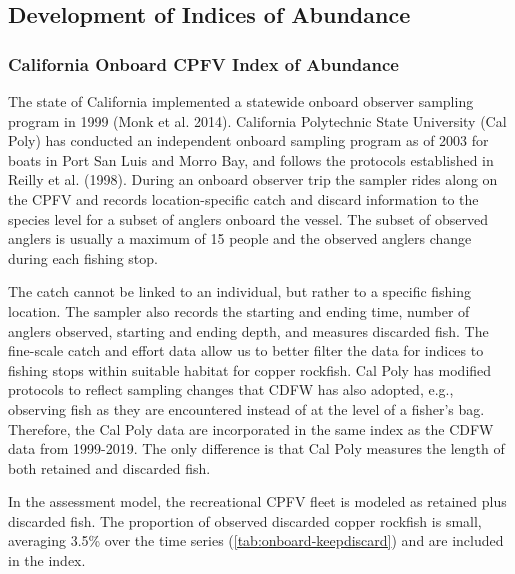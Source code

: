 \documentclass[11pt,
  english,
  letterpaper,
]{article}
\begin{document}
\newcommand{\lt}{\ensuremath <}
\newcommand{\gt}{\ensuremath >}

\linenumbers

\newcommand\CapeM{$40^\circ 10^\prime$ N. lat.}
\newcommand\PtC{$34^\circ 27^\prime$ N. lat.}
\newcommand\CAOR{$42^\circ 00^\prime$ N. lat.}

\hypertarget{development-of-indices-of-abundance}{%
\subsection{Development of Indices of Abundance}\label{development-of-indices-of-abundance}}

\hypertarget{onboard-cpfv-index}{%
\subsubsection{California Onboard CPFV Index of Abundance}\label{onboard-cpfv-index}}

The state of California implemented a statewide onboard observer sampling program in 1999 (Monk et al. 2014). California Polytechnic State University (Cal Poly) has conducted an independent onboard sampling program as of 2003 for boats in Port San Luis and Morro Bay, and follows the protocols established in Reilly et al. (1998). During an onboard observer trip the sampler rides along on the CPFV and records location-specific catch and discard information to the species level for a subset of anglers onboard the vessel. The subset of observed anglers is usually a maximum of 15 people and the observed anglers change during each fishing stop.

The catch cannot be linked to an individual, but rather to a specific fishing location. The sampler also records the starting and ending time, number of anglers observed, starting and ending depth, and measures discarded fish. The fine-scale catch and effort data allow us to better filter the data for indices to fishing stops within suitable habitat for copper rockfish. Cal Poly has modified protocols to reflect sampling changes that CDFW has also adopted, e.g., observing fish as they are encountered instead of at the level of a fisher's bag. Therefore, the Cal Poly data are incorporated in the same index as the CDFW data from 1999-2019. The only difference is that Cal Poly measures the length of both retained and discarded fish.

In the assessment model, the recreational CPFV fleet is modeled as retained plus discarded fish. The proportion of observed discarded copper rockfish is small, averaging 3.5\% over the time series (\ref{tab:onboard-keepdiscard}) and are included in the index.
\end{document}
